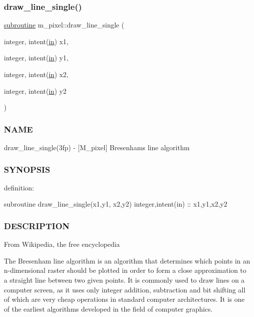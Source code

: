 \subsubsection{\texorpdfstring{draw\+\_\+line\+\_\+single()}{draw\_line\_single()}}
{\footnotesize\ttfamily \hyperlink{M__stopwatch_83_8txt_acfbcff50169d691ff02d4a123ed70482}{subroutine} m\+\_\+pixel\+::draw\+\_\+line\+\_\+single (\begin{DoxyParamCaption}\item[{integer, intent(\hyperlink{M__journal_83_8txt_afce72651d1eed785a2132bee863b2f38}{in})}]{x1,  }\item[{integer, intent(\hyperlink{M__journal_83_8txt_afce72651d1eed785a2132bee863b2f38}{in})}]{y1,  }\item[{integer, intent(\hyperlink{M__journal_83_8txt_afce72651d1eed785a2132bee863b2f38}{in})}]{x2,  }\item[{integer, intent(\hyperlink{M__journal_83_8txt_afce72651d1eed785a2132bee863b2f38}{in})}]{y2 }\end{DoxyParamCaption})\hspace{0.3cm}{\ttfamily [private]}}



\subsubsection*{N\+A\+ME}

draw\+\_\+line\+\_\+single(3fp) -\/ \mbox{[}M\+\_\+pixel\mbox{]} Bresenham\textquotesingle{}s line algorithm 

\subsubsection*{S\+Y\+N\+O\+P\+S\+IS}

definition\+:

subroutine draw\+\_\+line\+\_\+single(x1,y1, x2,y2) integer,intent(in) \+:\+: x1,y1,x2,y2

\subsubsection*{D\+E\+S\+C\+R\+I\+P\+T\+I\+ON}

From Wikipedia, the free encyclopedia

The Bresenham line algorithm is an algorithm that determines which points in an n-\/dimensional raster should be plotted in order to form a close approximation to a straight line between two given points. It is commonly used to draw lines on a computer screen, as it uses only integer addition, subtraction and bit shifting all of which are very cheap operations in standard computer architectures. It is one of the earliest algorithms developed in the field of computer graphics.

